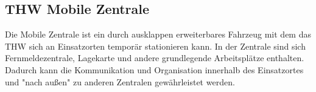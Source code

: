 \subsection{THW Mobile Zentrale}
Die Mobile Zentrale ist ein durch ausklappen erweiterbares Fahrzeug mit dem das THW sich an Einsatzorten temporär stationieren kann. In der Zentrale sind sich Fernmeldezentrale, Lagekarte und andere grundlegende Arbeitsplätze enthalten. Dadurch kann die Kommunikation und Organisation innerhalb des Einsatzortes und "nach außen" zu anderen Zentralen gewährleistet werden.
